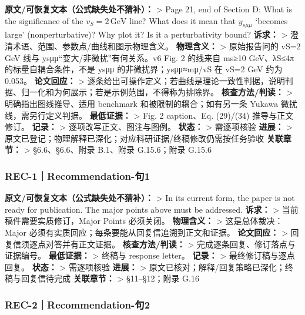 \documentclass[
]{article}
\begin{document}
\textbf{原文/可恢复文本（公式缺失处不猜补）：} \textgreater{} Page 21,
end of Section D: What is the significance of the
\(v_S=2\,\mathrm{GeV}\) line? What does it mean that \(y_{s\mu\mu}\)
`becomes large' (nonperturbative)? Why plot it? Is it a perturbativity
bound? \textbf{诉求：} \textgreater{}
澄清术语、范围、参数点/曲线和图示物理含义。 \textbf{物理含义：}
\textgreater{} 原始报告问的 vS=2 GeV 线与
ysμμ``变大/非微扰''有何关系。v6 Fig. 2 的线来自 ms≥10 GeV、λS≤4π
的标量自耦合条件，不是 ysμμ 的非微扰界；ysμμ≈mμ/vS 在 vS=2 GeV 约为
0.053。 \textbf{论文回应：} \textgreater{}
逐条给出可操作定义；若曲线是理论一致性判据，说明判据、归一化和为何展示；若是示例范围，不得称为排除界。
\textbf{核查方法/判读：} \textgreater{} 明确指出图线推导、适用 benchmark
和被限制的耦合；如有另一条 Yukawa 微扰线，需另行定义判据。
\textbf{最低证据：} \textgreater{} Fig. 2 caption、Eq. (29)/(34)
推导与正文修订。 \textbf{记录：} \textgreater{}
逐项改写正文、图注与图例。 \textbf{状态：} \textgreater{} 需逐项核验
\textbf{进展：} \textgreater{}
原文已登记；物理解释已深化；对应科研证据/终稿修改仍需按任务验收
\textbf{关联章节：} \textgreater{} §6.6、§6.6、附录 B.1、附录
G.15.6；附录 G.15.6

\subsubsection{REC-1｜Recommendation-句1}\label{rec-1recommendation-ux53e51}

\textbf{原文/可恢复文本（公式缺失处不猜补）：} \textgreater{} In its
current form, the paper is not ready for publication. The major points
above must be addressed. \textbf{诉求：} \textgreater{}
当前稿件需要实质修订，Major Points 必须关闭。 \textbf{物理含义：}
\textgreater{} 这是总体裁决：Major
必须有实质回应；每条要能从回复信追溯到正文和证据。 \textbf{论文回应：}
\textgreater{} 回复信须逐点对答并有正文证据。 \textbf{核查方法/判读：}
\textgreater{} 完成逐条回复、修订落点与证据编号。 \textbf{最低证据：}
\textgreater{} 终稿与 response letter。 \textbf{记录：} \textgreater{}
最终修订稿与逐点回复。 \textbf{状态：} \textgreater{} 需逐项核验
\textbf{进展：} \textgreater{}
原文已核对；解释/回复策略已深化；终稿与回复信待完成 \textbf{关联章节：}
\textgreater{} §11--§12；附录 G.16

\subsubsection{REC-2｜Recommendation-句2}\label{rec-2recommendation-ux53e52}
\end{document}
